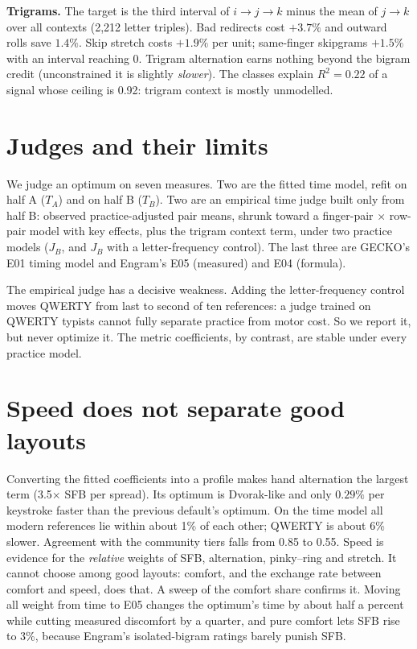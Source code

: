 \documentclass{gecko-paper}
\begin{document}
\begin{paperbody}
\textbf{Trigrams.} The target is the third interval of $i\to j\to k$ minus the mean of $j\to k$ over all contexts (2{,}212 letter triples). Bad redirects cost $+3.7\%$ and outward rolls save $1.4\%$. Skip stretch costs $+1.9\%$ per unit; same-finger skipgrams $+1.5\%$ with an interval reaching 0. Trigram alternation earns nothing beyond the bigram credit (unconstrained it is slightly \emph{slower}). The classes explain $R^2=0.22$ of a signal whose ceiling is 0.92: trigram context is mostly unmodelled.

\section{Judges and their limits}
We judge an optimum on seven measures. Two are the fitted time model, refit on half A ($T_A$) and on half B ($T_B$). Two are an empirical time judge built only from half B: observed practice-adjusted pair means, shrunk toward a finger-pair $\times$ row-pair model with key effects, plus the trigram context term, under two practice models ($J_B$, and $J_B$ with a letter-frequency control). The last three are GECKO's E01 timing model and Engram's E05 (measured) and E04 (formula).

The empirical judge has a decisive weakness. Adding the letter-frequency control moves QWERTY from last to second of ten references: a judge trained on QWERTY typists cannot fully separate practice from motor cost. So we report it, but never optimize it. The metric coefficients, by contrast, are stable under every practice model.

\section{Speed does not separate good layouts}
Converting the fitted coefficients into a profile makes hand alternation the largest term (3.5$\times$ SFB per spread). Its optimum is Dvorak-like and only $0.29\%$ per keystroke faster than the previous default's optimum. On the time model all modern references lie within about 1\% of each other; QWERTY is about 6\% slower. Agreement with the community tiers falls from 0.85 to 0.55. Speed is evidence for the \emph{relative} weights of SFB, alternation, pinky–ring and stretch. It cannot choose among good layouts: comfort, and the exchange rate between comfort and speed, does that. A sweep of the comfort share confirms it. Moving all weight from time to E05 changes the optimum's time by about half a percent while cutting measured discomfort by a quarter, and pure comfort lets SFB rise to 3\%, because Engram's isolated-bigram ratings barely punish SFB.


\end{paperbody}
\end{document}
